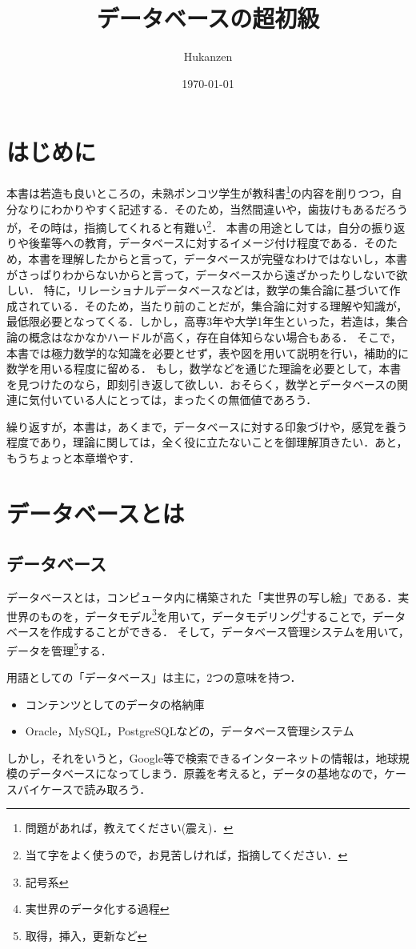 \documentclass[a4paper,10pt]{jreport}
\title{データベースの超初級}
\author{Hukanzen}
\date{\today}
\begin{document}
\maketitle

\tableofcontents %

\chapter{はじめに}
本書は若造も良いところの，未熟ポンコツ学生が教科書\footnote{問題があれば，教えてください(震え)．}の内容を削りつつ，自分なりにわかりやすく記述する．そのため，当然間違いや，歯抜けもあるだろうが，その時は，指摘してくれると有難い\footnote{当て字をよく使うので，お見苦しければ，指摘してください．}．
本書の用途としては，自分の振り返りや後輩等への教育，データベースに対するイメージ付け程度である．そのため，本書を理解したからと言って，データベースが完璧なわけではないし，本書がさっぱりわからないからと言って，データベースから遠ざかったりしないで欲しい．
特に，リレーショナルデータベースなどは，数学の集合論に基づいて作成されている．そのため，当たり前のことだが，集合論に対する理解や知識が，最低限必要となってくる．しかし，高専3年や大学1年生といった，若造は，集合論の概念はなかなかハードルが高く，存在自体知らない場合もある．
そこで，本書では極力数学的な知識を必要とせず，表や図を用いて説明を行い，補助的に数学を用いる程度に留める．
もし，数学などを通じた理論を必要として，本書を見つけたのなら，即刻引き返して欲しい．おそらく，数学とデータベースの関連に気付いている人にとっては，まったくの無価値であろう．
\par 繰り返すが，本書は，あくまで，データベースに対する印象づけや，感覚を養う程度であり，理論に関しては，全く役に立たないことを御理解頂きたい．あと，もうちょっと本章増やす．

\chapter{データベースとは}
\section{データベース}
データベースとは，コンピュータ内に構築された「実世界の写し絵」である．実世界のものを，データモデル\footnote{記号系}を用いて，データモデリング\footnote{実世界のデータ化する過程}することで，データベースを作成することができる．
そして，データベース管理システムを用いて，データを管理\footnote{取得，挿入，更新など}する．
\par 用語としての「データベース」は主に，2つの意味を持つ．
\begin{itemize}
	\item コンテンツとしてのデータの格納庫
	\item Oracle，MySQL，PostgreSQLなどの，データベース管理システム
\end{itemize}
\par しかし，それをいうと，Google等で検索できるインターネットの情報は，地球規模のデータベースになってしまう．原義を考えると，データの基地なので，ケースバイケースで読み取ろう．
\end{document}
